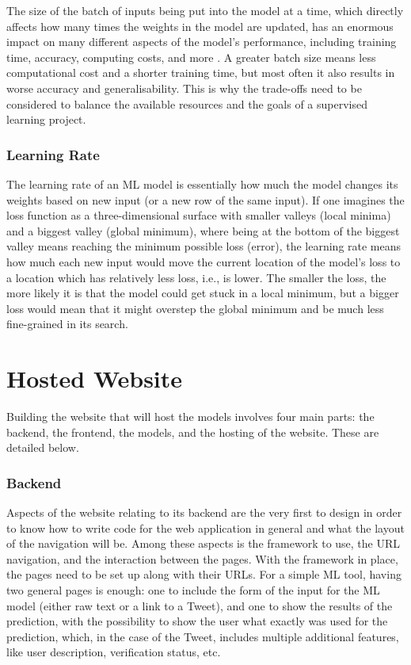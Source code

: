 \documentclass{l4proj}
\begin{document}
The size of the batch of inputs being put into the model at a time, which directly affects how many times the weights in the model are updated, has an enormous impact on many different aspects of the model's performance, including training time, accuracy, computing costs, and more \citep{BatchSize}. A greater batch size means less computational cost and a shorter training time, but most often it also results in worse accuracy and generalisability. This is why the trade-offs need to be considered to balance the available resources and the goals of a supervised learning project.

\subsubsection{Learning Rate}

The learning rate of an ML model is essentially how much the model changes its weights based on new input (or a new row of the same input). If one imagines the loss function as a three-dimensional surface with smaller valleys (local minima) and a biggest valley (global minimum), where being at the bottom of the biggest valley means reaching the minimum possible loss (error), the learning rate means how much each new input would move the current location of the model's loss to a location which has relatively less loss, i.e., is lower. The smaller the loss, the more likely it is that the model could get stuck in a local minimum, but a bigger loss would mean that it might overstep the global minimum and be much less fine-grained in its search.

\section{Hosted Website}
\label{sec:design_web}

Building the website that will host the models involves four main parts: the backend, the frontend, the models, and the hosting of the website. These are detailed below.

\subsubsection{Backend}

Aspects of the website relating to its backend are the very first to design in order to know how to write code for the web application in general and what the layout of the navigation will be. Among these aspects is the framework to use, the URL navigation, and the interaction between the pages. With the framework in place, the pages need to be set up along with their URLs. For a simple ML tool, having two general pages is enough: one to include the form of the input for the ML model (either raw text or a link to a Tweet), and one to show the results of the prediction, with the possibility to show the user what exactly was used for the prediction, which, in the case of the Tweet, includes multiple additional features, like user description, verification status, etc.
\end{document}
